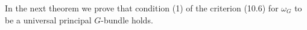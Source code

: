 In the next theorem we prove that condition (1) of the criterion (10.6) for $\omega_G$ to be a universal principal $G$-bundle holds.
